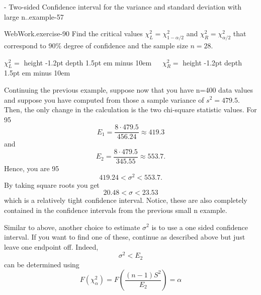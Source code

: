 \documentclass[10pt,]{book}
\newcommand{\fillin}[1]{\leavevmode\leaders\vrule height -1.2pt depth 1.5pt \hskip #1em minus #1em \null}
\numberwithin{equation}{section}
\newcommand{\lt}{<}
\begin{document}
 \begin{example}{- Two-sided Confidence interval for the variance and standard deviation with large n..}{example-57}%
\hypertarget{p-1337}{}%
\begin{inlineexercise}{WebWork.}{exercise-90}%
\hypertarget{p-1338}{}%
Find the critical values \(\chi_L^2 = \chi_{1-\alpha/2}^2\) and \(\chi_R^2 = \chi_{\alpha/2}^2\) that correspond to \(90\)\% degree of confidence and the sample size \(n = 28.\)%
\par
\hypertarget{p-1339}{}%
\(\chi_L^2 =\)  \fillin{10} \(\ \ \ \ \) \(\chi_R^2 =\)  \fillin{10}%
\end{inlineexercise}
%
\par
\hypertarget{p-1340}{}%
Continuing the previous example, suppose now that you have n=400 data values and suppose you have computed from those a sample variance of \(s^2 = 479.5\).  Then, the only change in the calculation is the two chi-square statistic values. For 95%
\begin{equation*}
E_1 = \frac{8 \cdot 479.5}{456.24} \approx 419.3
\end{equation*}
and%
\begin{equation*}
E_2 = \frac{8 \cdot 479.5}{345.55} \approx 553.7.
\end{equation*}
Hence, you are 95%
\begin{equation*}
419.24 \lt \sigma^2 \lt 553.7.
\end{equation*}
By taking square roots you get%
\begin{equation*}
20.48 \lt \sigma \lt 23.53
\end{equation*}
which is a relatively tight confidence interval.  Notice, these are also completely contained in the confidence intervals from the previous small n example.%
\end{example}
%
\par
\hypertarget{p-1341}{}%
Similar to above, another choice to estimate \(\sigma ^2\) is to use a one sided confidence interval. If you want to find one of these, continue as described above but just leave one endpoint off.  Indeed,%
\begin{equation*}
\sigma^2 \lt E_2
\end{equation*}
can be determined using%
\begin{equation*}
F(\chi^2_{\alpha} ) = F \left ( \frac{(n-1)S^2}{E_2} \right ) = \alpha
\end{equation*}
\end{document}
